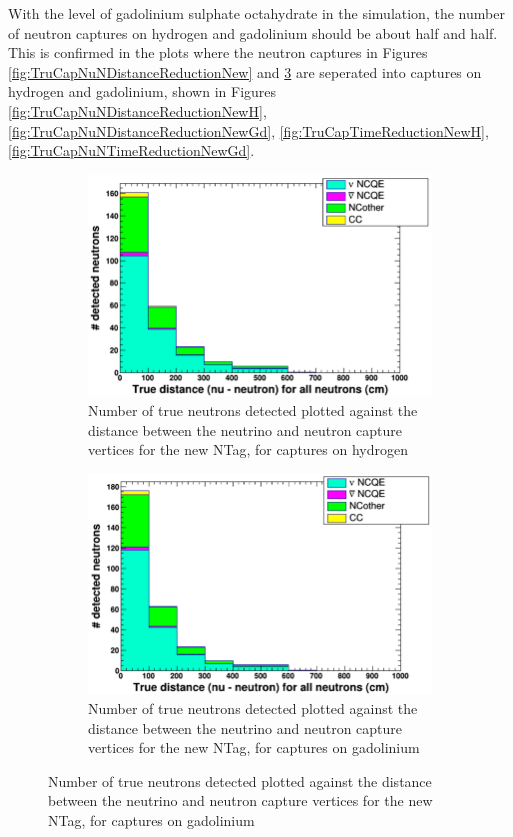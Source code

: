 With the level of gadolinium sulphate octahydrate in the simulation, the number of neutron captures on hydrogen and gadolinium should be about half and half. This is confirmed in the plots where the neutron captures in Figures \ref{fig:TruCapNuNDistanceReductionNew} and \ref{fig:TrueCapTimeReductionNew} are seperated into captures on hydrogen and gadolinium, shown in Figures \ref{fig:TruCapNuNDistanceReductionNewH}, \ref{fig:TruCapNuNDistanceReductionNewGd}, \ref{fig:TruCapTimeReductionNewH}, \ref{fig:TruCapNuNTimeReductionNewGd}.

\begin{figure}
    \centering
     \begin{subfigure}[b]{0.45\linewidth}
      \includegraphics[width=\linewidth]{Figures/TruCapNuNDistanceReductionNewH.PNG}
      \caption{Number of true neutrons detected plotted against the distance between the neutrino and neutron capture vertices for the new NTag, for captures on hydrogen}
      \label{fig:TrueCapTimeReductionLegacy} 
     \end{subfigure}
     \begin{subfigure}[b]{0.45\linewidth}
       \includegraphics[width=\linewidth]{Figures/TruCapNuNDistanceReductionNewGd.PNG}
        \caption{Number of true neutrons detected plotted against the distance between the neutrino and neutron capture vertices for the new NTag, for captures on gadolinium} 
     \label{fig:TrueCapTimeReductionNew}
      \end{subfigure} 
\end{figure}


